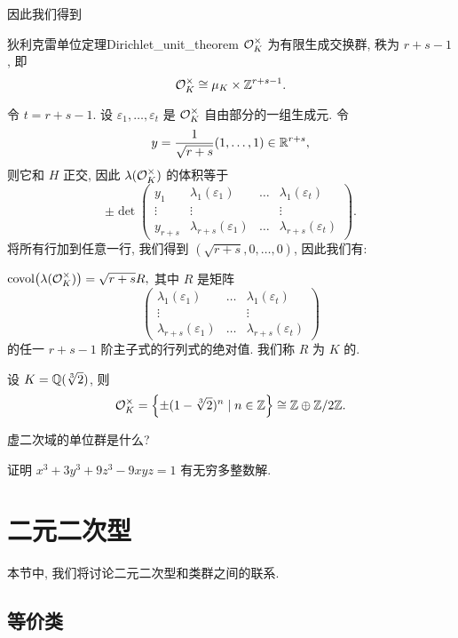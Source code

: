 因此我们得到
\begin{theorem}{狄利克雷单位定理}{Dirichlet_unit_theorem}
${\mathcal{O}}_K^\times$ 为有限生成交换群, 秩为 $r+s-1$, 即
  \[{\mathcal{O}}_K^\times\cong \mu_K\times {\mathbb{Z}}^{r+s-1}.\]
\end{theorem}

令  $t=r+s-1$. 设 $\varepsilon_1,\dots,\varepsilon_t$ 是 ${\mathcal{O}}_K^\times$ 自由部分的一组生成元. 令
  \[y=\frac{1}{\sqrt{r+s}}(1,\dots,1)\in{\mathbb{R}}^{r+s},\]
则它和 $H$ 正交, 因此 $\lambda({\mathcal{O}}_K^\times)$ 的体积等于
  \[\pm\det\begin{pmatrix}
y_1 & \lambda_1(\varepsilon_1) &\dots& \lambda_1(\varepsilon_t)\\
\vdots & \vdots & & \vdots\\
y_{r+s} & \lambda_{r+s}(\varepsilon_1) &\dots& \lambda_{r+s}(\varepsilon_t)
\end{pmatrix}.\]
将所有行加到任意一行, 我们得到 $(\sqrt{r+s},0,\dots,0)$, 因此我们有:
\begin{proposition}{}{}
${\mathrm{covol}}\bigl(\lambda({\mathcal{O}}_K^\times)\bigr)=\sqrt{r+s}R,$ 其中 $R$ 是矩阵
  \[\begin{pmatrix}
\lambda_1(\varepsilon_1) &\dots& \lambda_1(\varepsilon_t)\\
\vdots & & \vdots\\
\lambda_{r+s}(\varepsilon_1) &\dots& \lambda_{r+s}(\varepsilon_t)
\end{pmatrix}\]
的任一 $r+s-1$ 阶主子式的行列式的绝对值. 我们称 $R$ 为 $K$ 的.
\end{proposition}

\begin{example}
设 $K={\mathbb{Q}}(\sqrt[3]{2})$, 则
  \[{\mathcal{O}}_K^\times=\left\{\pm(1-\sqrt[3]{2})^n\mid n\in{\mathbb{Z}}\right\}\cong {\mathbb{Z}}\oplus {\mathbb{Z}}/2{\mathbb{Z}}.\]
\end{example}

\begin{exercise}
虚二次域的单位群是什么?
\end{exercise}

\begin{exercise}
证明 $x^3+3y^3+9z^3-9xyz=1$ 有无穷多整数解.
\end{exercise}


\section{二元二次型}
本节中, 我们将讨论二元二次型和类群之间的联系.

\subsection{等价类}

